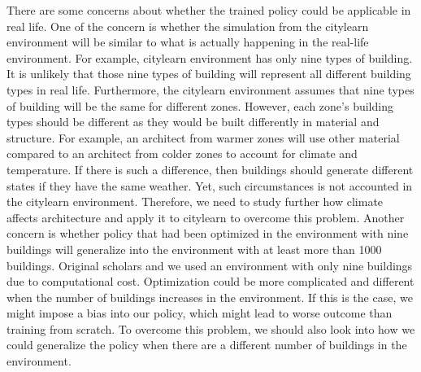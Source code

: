 \documentclass{article}
\begin{document}
There are some concerns about whether the trained policy could be applicable in real life. One of the concern is whether the simulation from the citylearn environment will be similar to what is actually happening in the real-life environment. For example, citylearn environment has only nine types of building. It is unlikely that those nine types of building will represent all different building types in real life. Furthermore, the citylearn environment assumes that nine types of building will be the same for different zones. However, each zone's building types should be different as they would be built differently in material and structure. For example, an architect from warmer zones will use other material compared to an architect from colder zones to account for climate and temperature. If there is such a difference, then buildings should generate different states if they have the same weather. Yet, such circumstances is not accounted in the citylearn environment. Therefore, we need to study further how climate affects architecture and apply it to citylearn to overcome this problem. 
\newline
Another concern is whether policy that had been optimized in the environment with nine buildings will generalize into the environment with at least more than 1000 buildings. Original scholars and we used an environment with only nine buildings due to computational cost. Optimization could be more complicated and different when the number of buildings increases in the environment. If this is the case, we might impose a bias into our policy, which might lead to worse outcome than training from scratch. To overcome this problem, we should also look into how we could generalize the policy when there are a different number of buildings in the environment. 


%


\end{document}
